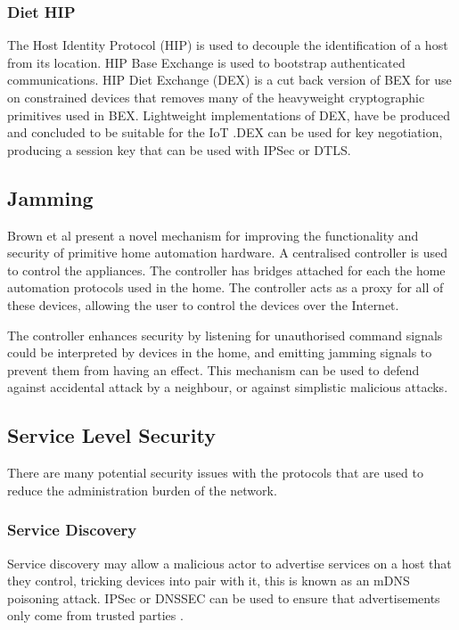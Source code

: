 \documentclass[10pt,journal,compsoc]{IEEEtran}
\begin{document}
\subsubsection{Diet HIP}
The Host Identity Protocol (HIP) is used to decouple the identification of a
host from its location. HIP Base Exchange is used to bootstrap authenticated
communications. HIP Diet Exchange (DEX) is a cut back version of BEX for use on
constrained devices that removes many of the heavyweight cryptographic
primitives used in BEX.  Lightweight implementations of DEX, have be produced
and concluded to be suitable for the IoT \cite{Meca2013}.DEX can be used for
key negotiation, producing a session key that can be used with IPSec or DTLS. 

\subsection{Jamming}
Brown et al \cite{Brown2013} present a novel mechanism for improving the
functionality and security of primitive home automation hardware. A centralised
controller is used to control the appliances. The controller has bridges
attached for each the home automation protocols used in the home. The
controller acts as a proxy for all of these devices, allowing the user to
control the devices over the Internet. 

The controller enhances security by listening for unauthorised command signals
could be interpreted by devices in the home, and emitting jamming signals to
prevent them from having an effect. This mechanism can be used to defend
against accidental attack by a neighbour, or against simplistic malicious
attacks. 

\subsection{Service Level Security}
There are many potential security issues with the protocols that are used to
reduce the administration burden of the network. 

\subsubsection{Service Discovery}
Service discovery may allow a malicious actor to advertise services on a host
that they control, tricking devices into pair with it, this is known as an mDNS
poisoning attack. IPSec or DNSSEC can be used to ensure that advertisements
only come from trusted parties \cite{Cheshire2013}. 
\end{document}
